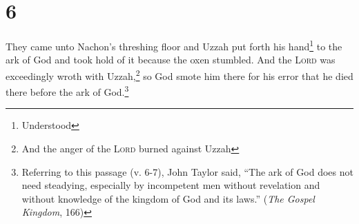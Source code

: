 \section{6}
\begin{enumerate}[align=center]
     They came unto Nachon's threshing floor and Uzzah put forth his hand\footnote{Understood} to the ark of God and took hold of it because the oxen stumbled.%
     And the \textsc{Lord} was exceedingly wroth with Uzzah,\footnote{And the anger of the \textsc{Lord} burned against Uzzah} so God smote him there for his error that he died there before the ark of God.\footnote{Referring to this passage (v. 6-7), John Taylor said, ``The ark of God does not need steadying, especially by incompetent men without revelation and without knowledge of the kingdom of God and its laws.'' (\textit{The Gospel Kingdom}, 166)}%
\end{enumerate}

